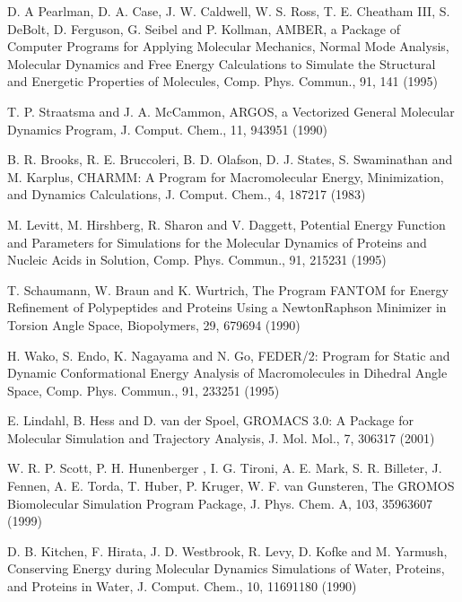 \documentclass[letterpaper,11pt,english]{sphinxmanual}
\begin{document}
     D. A Pearlman, D. A. Case, J. W. Caldwell, W. S. Ross, T. E. Cheatham III, S. DeBolt, D. Ferguson, G. Seibel and P. Kollman, AMBER, a Package of Computer Programs for Applying Molecular Mechanics, Normal Mode Analysis, Molecular Dynamics and Free Energy Calculations to Simulate the Structural and Energetic Properties of Molecules, Comp. Phys. Commun., 91, 1\sphinxhyphen{}41 (1995)

     T. P. Straatsma and J. A. McCammon, ARGOS, a Vectorized General Molecular Dynamics Program, J. Comput. Chem., 11, 943\sphinxhyphen{}951 (1990)

     B. R. Brooks, R. E. Bruccoleri, B. D. Olafson, D. J. States, S. Swaminathan and M. Karplus, CHARMM: A Program for Macromolecular Energy, Minimization, and Dynamics Calculations, J. Comput. Chem., 4, 187\sphinxhyphen{}217 (1983)

     M. Levitt, M. Hirshberg, R. Sharon and V. Daggett, Potential Energy Function and Parameters for Simulations for the Molecular Dynamics of Proteins and Nucleic Acids in Solution, Comp. Phys. Commun., 91, 215\sphinxhyphen{}231 (1995)

     T. Schaumann, W. Braun and K. Wurtrich, The Program FANTOM for Energy Refinement of Polypeptides and Proteins Using a Newton\sphinxhyphen{}Raphson Minimizer in Torsion Angle Space, Biopolymers, 29, 679\sphinxhyphen{}694 (1990)

     H. Wako, S. Endo, K. Nagayama and N. Go, FEDER/2: Program for Static and Dynamic Conformational Energy Analysis of Macro\sphinxhyphen{}molecules in Dihedral Angle Space, Comp. Phys. Commun., 91, 233\sphinxhyphen{}251 (1995)

     E. Lindahl, B. Hess and D. van der Spoel, GROMACS 3.0: A Package for Molecular Simulation and Trajectory Analysis, J. Mol. Mol., 7, 306\sphinxhyphen{}317 (2001)

     W. R. P. Scott, P. H. Hunenberger , I. G. Tironi, A. E. Mark, S. R. Billeter, J. Fennen, A. E. Torda, T. Huber, P. Kruger, W. F. van Gunsteren, The GROMOS Biomolecular Simulation Program Package, J. Phys. Chem. A, 103, 3596\sphinxhyphen{}3607 (1999)

     D. B. Kitchen, F. Hirata, J. D. Westbrook, R. Levy, D. Kofke and M. Yarmush, Conserving Energy during Molecular Dynamics Simulations of Water, Proteins, and Proteins in Water, J. Comput. Chem., 10, 1169\sphinxhyphen{}1180 (1990)
\end{document}
